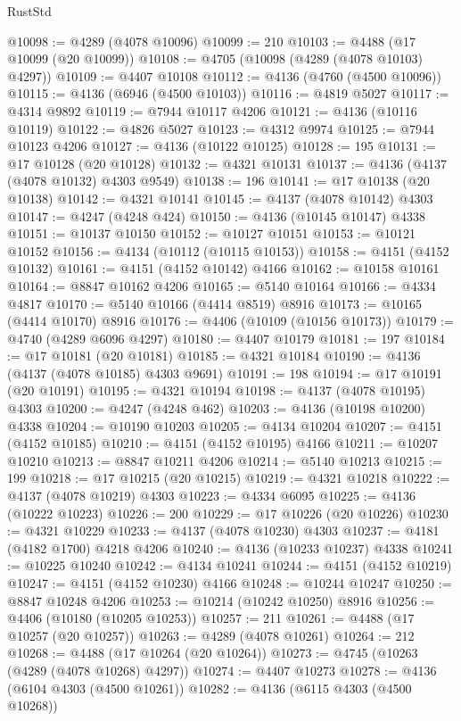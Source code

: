 \begin{lexlean}{RustStd}
\begin{coremodule}
{\begin{coremodule}
{{{{{{{{{{{{{{{{{{{{{{{{{{{{{{{{{{{{{{{{{{{{{{{{{{@10098 := @4289 (@4078 @10096)
@10099 := 210
@10103 := @4488 (@17 @10099 (@20 @10099))
@10108 := @4705 (@10098 (@4289 (@4078 @10103) @4297))
@10109 := @4407 @10108
@10112 := @4136 (@4760 (@4500 @10096))
@10115 := @4136 (@6946 (@4500 @10103))
@10116 := @4819 @5027
@10117 := @4314 @9892
@10119 := @7944 @10117 @4206
@10121 := @4136 (@10116 @10119)
@10122 := @4826 @5027
@10123 := @4312 @9974
@10125 := @7944 @10123 @4206
@10127 := @4136 (@10122 @10125)
@10128 := 195
@10131 := @17 @10128 (@20 @10128)
@10132 := @4321 @10131
@10137 := @4136 (@4137 (@4078 @10132) @4303 @9549)
@10138 := 196
@10141 := @17 @10138 (@20 @10138)
@10142 := @4321 @10141
@10145 := @4137 (@4078 @10142) @4303
@10147 := @4247 (@4248 @424)
@10150 := @4136 (@10145 @10147) @4338
@10151 := @10137 @10150
@10152 := @10127 @10151
@10153 := @10121 @10152
@10156 := @4134 (@10112 (@10115 @10153))
@10158 := @4151 (@4152 @10132)
@10161 := @4151 (@4152 @10142) @4166
@10162 := @10158 @10161
@10164 := @8847 @10162 @4206
@10165 := @5140 @10164
@10166 := @4334 @4817
@10170 := @5140 @10166 (@4414 @8519) @8916
@10173 := @10165 (@4414 @10170) @8916
@10176 := @4406 (@10109 (@10156 @10173))
@10179 := @4740 (@4289 @6096 @4297)
@10180 := @4407 @10179
@10181 := 197
@10184 := @17 @10181 (@20 @10181)
@10185 := @4321 @10184
@10190 := @4136 (@4137 (@4078 @10185) @4303 @9691)
@10191 := 198
@10194 := @17 @10191 (@20 @10191)
@10195 := @4321 @10194
@10198 := @4137 (@4078 @10195) @4303
@10200 := @4247 (@4248 @462)
@10203 := @4136 (@10198 @10200) @4338
@10204 := @10190 @10203
@10205 := @4134 @10204
@10207 := @4151 (@4152 @10185)
@10210 := @4151 (@4152 @10195) @4166
@10211 := @10207 @10210
@10213 := @8847 @10211 @4206
@10214 := @5140 @10213
@10215 := 199
@10218 := @17 @10215 (@20 @10215)
@10219 := @4321 @10218
@10222 := @4137 (@4078 @10219) @4303
@10223 := @4334 @6095
@10225 := @4136 (@10222 @10223)
@10226 := 200
@10229 := @17 @10226 (@20 @10226)
@10230 := @4321 @10229
@10233 := @4137 (@4078 @10230) @4303
@10237 := @4181 (@4182 @1700) @4218 @4206
@10240 := @4136 (@10233 @10237) @4338
@10241 := @10225 @10240
@10242 := @4134 @10241
@10244 := @4151 (@4152 @10219)
@10247 := @4151 (@4152 @10230) @4166
@10248 := @10244 @10247
@10250 := @8847 @10248 @4206
@10253 := @10214 (@10242 @10250) @8916
@10256 := @4406 (@10180 (@10205 @10253))
@10257 := 211
@10261 := @4488 (@17 @10257 (@20 @10257))
@10263 := @4289 (@4078 @10261)
@10264 := 212
@10268 := @4488 (@17 @10264 (@20 @10264))
@10273 := @4745 (@10263 (@4289 (@4078 @10268) @4297))
@10274 := @4407 @10273
@10278 := @4136 (@6104 @4303 (@4500 @10261))
@10282 := @4136 (@6115 @4303 (@4500 @10268))
}}}}}}}}}}}}}}}}}}}}}}}}}}}}}}}}}}}}}}}}}}}}}}}}}}
\end{coremodule}}
\end{coremodule}
\end{lexlean}

